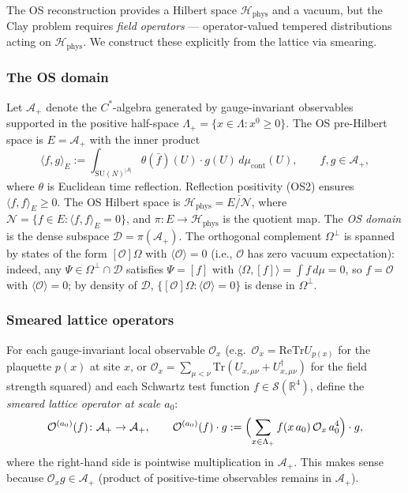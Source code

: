 \documentclass[11pt,a4paper]{amsart}
\theoremstyle{definition}
\newcommand{\SU}{\mathrm{SU}}
\newcommand{\R}{\mathbb{R}}
\newcommand{\re}{\mathrm{Re}}
\newcommand{\Tr}{\mathrm{Tr}}
\begin{document}
The OS reconstruction provides a Hilbert space $\mathcal{H}_{\mathrm{phys}}$ and a
vacuum, but the Clay problem requires \emph{field operators} — operator-valued
tempered distributions acting on $\mathcal{H}_{\mathrm{phys}}$.  We construct
these explicitly from the lattice via smearing.

\subsubsection*{The OS domain}

Let $\mathcal{A}_+ $ denote the $C^*$-algebra generated by gauge-invariant
observables supported in the positive half-space
$\Lambda_+ = \{x \in \Lambda : x^0 \ge 0\}$.  The OS pre-Hilbert space is
$E = \mathcal{A}_+$ with the inner product
\[
  \langle f, g \rangle_E
  := \int_{\SU(N)^{|\Lambda|}} \theta(\bar f)(U)\cdot g(U)\,d\mu_{\mathrm{cont}}(U),
  \qquad f,g\in\mathcal{A}_+,
\]
where $\theta$ is Euclidean time reflection.  Reflection positivity (OS2) ensures
$\langle f,f\rangle_E \ge 0$.  The OS Hilbert space is
$\mathcal{H}_{\mathrm{phys}} = \overline{E/\mathcal{N}}$,
where $\mathcal{N} = \{f\in E:\langle f,f\rangle_E = 0\}$, and
$\pi\colon E \to \mathcal{H}_{\mathrm{phys}}$ is the quotient map.
The \emph{OS domain} is the dense subspace $\mathcal{D} = \pi(\mathcal{A}_+)$.
The orthogonal complement $\Omega^\perp$ is spanned by states of the form
$[\mathcal{O}]\Omega$ with $\langle\mathcal{O}\rangle = 0$ (i.e., $\mathcal{O}$
has zero vacuum expectation): indeed, any $\Psi \in \Omega^\perp \cap \mathcal{D}$
satisfies $\Psi = [f]$ with $\langle\Omega, [f]\rangle = \int f\,d\mu = 0$,
so $f = \mathcal{O}$ with $\langle\mathcal{O}\rangle = 0$;
by density of $\mathcal{D}$, $\{[\mathcal{O}]\Omega : \langle\mathcal{O}\rangle=0\}$
is dense in $\Omega^\perp$.

\subsubsection*{Smeared lattice operators}

For each gauge-invariant local observable $\mathcal{O}_x$ (e.g.\
$\mathcal{O}_x = \re\Tr U_{p(x)}$ for the plaquette $p(x)$ at site $x$,
or $\mathcal{O}_x = \sum_{\mu<\nu}\Tr(U_{x,\mu\nu} + U_{x,\mu\nu}^\dagger)$
for the field strength squared)
and each Schwartz test function $f\in\mathcal{S}(\R^4)$, define the
\emph{smeared lattice operator at scale $a_0$}:
\[
  \mathcal{O}^{(a_0)}(f)
  \colon \mathcal{A}_+ \to \mathcal{A}_+,
  \qquad
  \mathcal{O}^{(a_0)}(f)\cdot g
  := \Bigl(\sum_{x\in\Lambda_+} f(x\,a_0)\,\mathcal{O}_x\,a_0^4\Bigr)\cdot g,
\]
where the right-hand side is pointwise multiplication in $\mathcal{A}_+$.
This makes sense because $\mathcal{O}_x g\in \mathcal{A}_+$ (product of
positive-time observables remains in $\mathcal{A}_+$).
\end{document}
